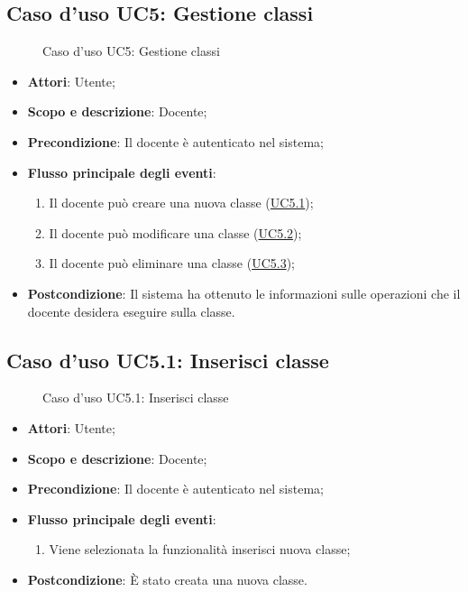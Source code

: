 \documentclass[12pt,a4paper]{article}
\begin{document}
\subsection{Caso d'uso UC5: Gestione classi}
\begin{figure}[H]
	\centering

	\caption{Caso d'uso UC5: Gestione classi}\label{fig:UC5} 
\end{figure}\begin{itemize}
\item \textbf{Attori}: Utente;
\item \textbf{Scopo e descrizione}: Docente; 
\item \textbf{Precondizione}: Il docente è autenticato nel sistema;

\item \textbf{Flusso principale degli eventi}:
\begin{enumerate}
	\item Il docente può creare una nuova classe (\hyperlink{UC5.1}{UC5.1});
	\item Il docente può modificare una classe (\hyperlink{UC5.2}{UC5.2});
	\item Il docente può eliminare una classe (\hyperlink{UC5.3}{UC5.3});
	
\end{enumerate}
\item \textbf{Postcondizione}: Il sistema ha ottenuto le informazioni sulle operazioni che il docente desidera eseguire sulla classe.
\end{itemize}
\hypertarget{UC5.1}{}
\subsection{Caso d'uso UC5.1: Inserisci classe}
\begin{figure}[H]
	\centering

	\caption{Caso d'uso UC5.1: Inserisci classe}\label{fig:UC5.1} 
\end{figure}\begin{itemize}
\item \textbf{Attori}: Utente;
\item \textbf{Scopo e descrizione}: Docente; 
\item \textbf{Precondizione}: Il docente è autenticato nel sistema;

\item \textbf{Flusso principale degli eventi}:
\begin{enumerate}
	\item Viene selezionata la funzionalità inserisci nuova classe;
	
\end{enumerate}
\item \textbf{Postcondizione}: È stato creata una nuova classe.
\end{itemize}
\hypertarget{UC5.2}{}
\end{document}
